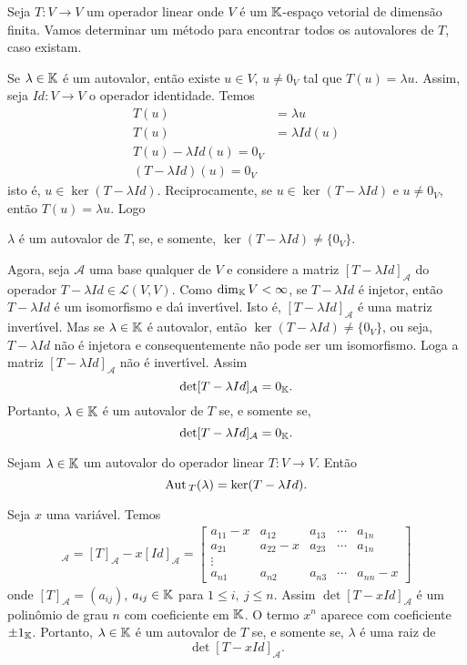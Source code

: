 Seja $T : V \to V$ um operador linear onde $V$ \'e um $\mathbb{K}$-espa\c{c}o vetorial de dimens\~ao finita. Vamos determinar um m\'etodo para encontrar todos os autovalores de $T$, caso existam.

Se $\lambda \in \mathbb{K}$ \'e um autovalor, ent\~ao existe $u \in V$, $u \ne 0_V$ tal que $T(u) = \lambda u$. Assim, seja $Id : V \to V$ o operador identidade. Temos
\begin{align*}
	T(u) &= \lambda u\\
	T(u) &= \lambda Id(u)\\
	T(u) - \lambda Id(u) = 0_V\\
	(T - \lambda Id)(u) = 0_V
\end{align*}
isto \'e, $u \in \ker (T - \lambda Id)$. Reciprocamente, se $u \in \ker (T - \lambda Id)$ e $u \ne 0_V$, ent\~ao $T(u) = \lambda u$. Logo
\begin{center}
		$\lambda$ \'e um autovalor de $T$, se, e somente, $\ker (T - \lambda Id) \ne \{0_V\}$.
\end{center}

Agora, seja $\mathcal{A}$ uma base qualquer de $V$ e considere a matriz $[T - \lambda Id]_\mathcal{A}$ do operador $T - \lambda Id \in \mathcal{L}(V,V)$. Como $\dim_{\mathbb{K}}V < \infty$, se $T - \lambda Id$ \'e injetor, ent\~ao $T - \lambda Id$ \'e um isomorfismo e da{\'\i} invert{\'\i}vel. Isto \'e, $[T - \lambda Id]_\mathcal{A}$ \'e uma matriz invert{\'\i}vel. Mas se $\lambda \in \mathbb{K}$ \'e autovalor, ent\~ao $\ker (T - \lambda Id) \ne \{0_V\}$, ou seja, $T - \lambda Id$ n\~ao \'e injetora e consequentemente n\~ao pode ser um isomorfismo. Loga a matriz $[T - \lambda Id]_\mathcal{A}$ n\~ao \'e invert{\'\i}vel. Assim
\[
\det [T - \lambda Id]_\mathcal{A} = 0_{\mathbb{K}}.
\]
Portanto, $\lambda \in \mathbb{K}$ \'e um autovalor de $T$ se, e somente se,
\[
\det [T - \lambda Id]_\mathcal{A} = 0_{\mathbb{K}}.
\]

\begin{proposicao}
	Sejam $\lambda \in \mathbb{K}$ um autovalor do operador linear $T : V \to V$. Ent\~ao
	\[
		{\rm Aut\,}_T(\lambda) = \ker(T - \lambda Id).
	\]
\end{proposicao}

Seja $x$ uma vari\'avel. Temos
\begin{align}
	[T - xId]_\mathcal{A} = [T]_\mathcal{A} - x[Id]_\mathcal{A} = \begin{bmatrix}
		a_{11} - x & a_{12} & a_{13} & \cdots & a_{1n}\\
		a_{21} & a_{22} - x & a_{23} & \cdots & a_{1n}\\
		\vdots\\
		a_{n1} & a_{n2} & a_{n3} & \cdots & a_{nn} - x
	\end{bmatrix}
\end{align}
onde $[T]_\mathcal{A} = (a_{ij})$, $a_{ij} \in \mathbb{K}$ para $1 \le i,\ j \le n$. Assim $\det[T - xId]_\mathcal{A}$ \'e um polin\^omio de grau $n$ com coeficiente em $\mathbb{K}$. O termo $x^n$ aparece com coeficiente $\pm 1_{\mathbb{K}}$. Portanto, $\lambda \in \mathbb{K}$ \'e um autovalor de $T$ se, e somente se, $\lambda$ \'e uma raiz de
\[
\det[T - xId]_\mathcal{A}.
\]

